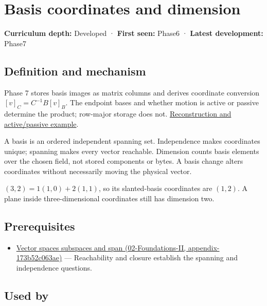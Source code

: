 \hypertarget{appendix-ce0341f7ea0d}{}
\section{Basis coordinates and dimension}\label{appendix-ce0341f7ea0d-basis-coordinates-and-dimension}

\textbf{Curriculum depth:} Developed · \textbf{First seen:} Phase6 · \textbf{Latest development:} Phase7

\subsection{Definition and mechanism}\label{appendix-ce0341f7ea0d-definition-and-mechanism}

Phase 7 stores basis images as matrix columns and derives coordinate conversion \([v]_C=C^{-1}B[v]_B\). The endpoint bases and whether motion is active or passive determine the product; row-major storage does not. \hyperref[01-foundations-i-ch019-coordinates-can-change-while-the-geometric-object-stays-still]{Reconstruction and active/passive example}.

A basis is an ordered independent spanning set. Independence makes coordinates unique; spanning makes every vector reachable. Dimension counts basis elements over the chosen field, not stored components or bytes. A basis change alters coordinates without necessarily moving the physical vector.

\((3,2)=1(1,0)+2(1,1)\), so its slanted-basis coordinates are \((1,2)\). A plane inside three-dimensional coordinates still has dimension two.

\subsection{Prerequisites}\label{appendix-ce0341f7ea0d-prerequisites}

\begin{itemize}
\tightlist
\item
  \href{../02-Foundations-II/main.pdf\#nameddest=appendix-173b52c063ae}{Vector spaces subspaces and span (02-Foundations-II, appendix-173b52c063ae)} --- Reachability and closure establish the spanning and independence questions.
\end{itemize}

\subsection{Used by}\label{appendix-ce0341f7ea0d-used-by}

